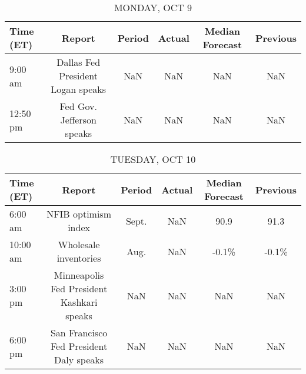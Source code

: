 \documentclass{article}%
\begin{document}
%
\normalsize%


\begin{table}[htbp]%
\caption{MONDAY, OCT 9}%
\centering%
\begin{adjustbox}{width=1\textwidth}%
\begin{tabular}{lccccc}
\toprule
Time (ET) &                            Report & Period & Actual & Median Forecast & Previous \\
\midrule
  9:00 am & Dallas Fed President Logan speaks &    NaN &    NaN &             NaN &      NaN \\
 12:50 pm &         Fed Gov. Jefferson speaks &    NaN &    NaN &             NaN &      NaN \\
\bottomrule
\end{tabular}
%
\end{adjustbox}%
\end{table}

%


\begin{table}[htbp]%
\caption{TUESDAY, OCT 10}%
\centering%
\begin{adjustbox}{width=1\textwidth}%
\begin{tabular}{lccccc}
\toprule
Time (ET) &                                    Report & Period & Actual & Median Forecast & Previous \\
\midrule
  6:00 am &                       NFIB optimism index &  Sept. &    NaN &            90.9 &     91.3 \\
 10:00 am &                     Wholesale inventories &   Aug. &    NaN &           -0.1\% &    -0.1\% \\
  3:00 pm & Minneapolis Fed President Kashkari speaks &    NaN &    NaN &             NaN &      NaN \\
  6:00 pm &   San Francisco Fed President Daly speaks &    NaN &    NaN &             NaN &      NaN \\
\bottomrule
\end{tabular}
%
\end{adjustbox}%
\end{table}

%
\end{document}
